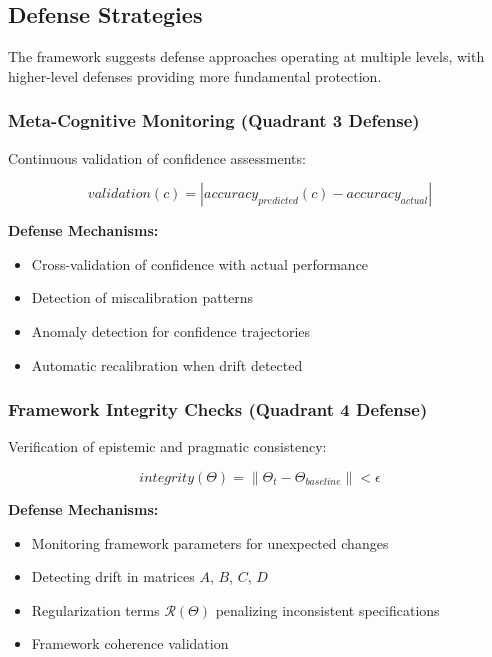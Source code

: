 \documentclass[
]{article}
\providecommand{\tightlist}{%
  \setlength{\itemsep}{0pt}\setlength{\parskip}{0pt}}
\begin{document}
\subsection{Defense Strategies}\label{sec:defense_strategies}

The framework suggests defense approaches operating at multiple levels,
with higher-level defenses providing more fundamental protection.

\subsubsection{Meta-Cognitive Monitoring (Quadrant 3
Defense)}\label{meta-cognitive-monitoring-quadrant-3-defense}

Continuous validation of confidence assessments:

\begin{equation}
validation(c) = |accuracy_{predicted}(c) - accuracy_{actual}|
\label{eq:confidence_validation}
\end{equation}

\textbf{Defense Mechanisms:}

\begin{itemize}
\tightlist
\item
  Cross-validation of confidence with actual performance
\item
  Detection of miscalibration patterns
\item
  Anomaly detection for confidence trajectories
\item
  Automatic recalibration when drift detected
\end{itemize}

\subsubsection{Framework Integrity Checks (Quadrant 4
Defense)}\label{framework-integrity-checks-quadrant-4-defense}

Verification of epistemic and pragmatic consistency:

\begin{equation}
integrity(\Theta) = \|\Theta_t - \Theta_{baseline}\| < \epsilon
\label{eq:framework_integrity}
\end{equation}

\textbf{Defense Mechanisms:}

\begin{itemize}
\tightlist
\item
  Monitoring framework parameters for unexpected changes
\item
  Detecting drift in matrices \(A\), \(B\), \(C\), \(D\)
\item
  Regularization terms \(\mathcal{R}(\Theta)\) penalizing inconsistent
  specifications
\item
  Framework coherence validation
\end{itemize}
\end{document}
